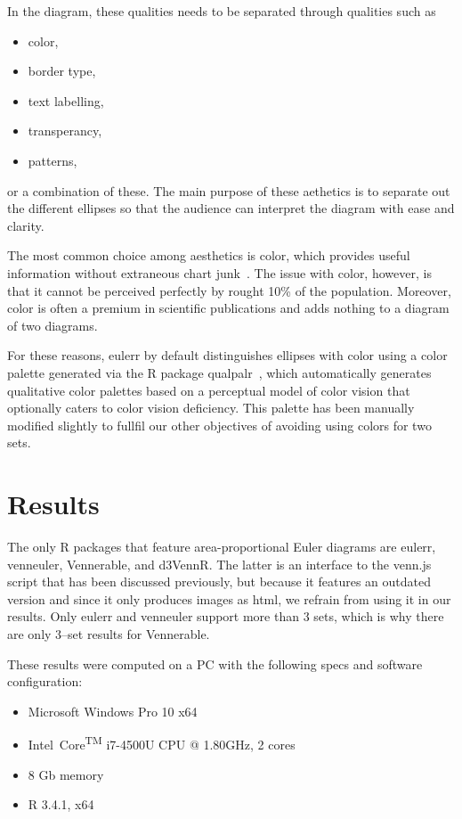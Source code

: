 \documentclass[
  a4paper,
  nofonts,
  nobib,
  titlepage,
  justified,
  marginals=raggedouter,
  nohyper
]{tufte-handout}\usepackage[]{graphicx}\usepackage[]{color}
\newcommand{\pkg}[1]{{\fontseries{b}\selectfont #1}}
\begin{document}
In the diagram, these qualities needs to be separated through qualities such
as
%
\begin{itemize}
\item color,
\item border type,
\item text labelling,
\item transperancy,
\item patterns,
\end{itemize}
%
or a combination of these. The main purpose of these aethetics is to
separate out the different ellipses so that the audience can interpret the
diagram with ease and clarity.

The most common choice among aesthetics is color, which provides useful
information without extraneous chart junk~\citep{tufte_x}. The issue with color,
however, is that it cannot be perceived perfectly by rought 10\% of the
population. Moreover, color is often a premium in scientific publications and
adds nothing to a diagram of two diagrams.

For these reasons, \pkg{eulerr} by default distinguishes ellipses with color
using a color palette generated via the \pkg{R} package
\pkg{qualpalr}~\citep{larsson_2016}, which automatically generates qualitative color
palettes based on a perceptual model of color vision that optionally caters
to color vision deficiency. This palette has been manually modified slightly to
fullfil our other objectives of avoiding using colors for two sets.

\section{Results}
\label{sec:results}

The only \pkg{R} packages that feature area-proportional Euler diagrams are
\pkg{eulerr}, \pkg{venneuler}, \pkg{Vennerable}, and \pkg{d3VennR}. The latter is an
interface to the \pkg{venn.js} script that has been discussed previously, but
because it features an outdated version and since it only produces
images as html, we refrain from using it in our results. Only \pkg{eulerr} and
\pkg{venneuler} support more than 3 sets, which is why there are only 3--set
results for \pkg{Vennerable}.

These results were computed on a PC with the following specs and software
configuration:
\begin{itemize}
\item Microsoft Windows Pro 10 x64
\item Intel\textregistered~Core\textsuperscript{TM} i7-4500U CPU @ 1.80GHz, 2 cores
\item 8 Gb memory
\item R 3.4.1, x64
\end{itemize}
\end{document}
